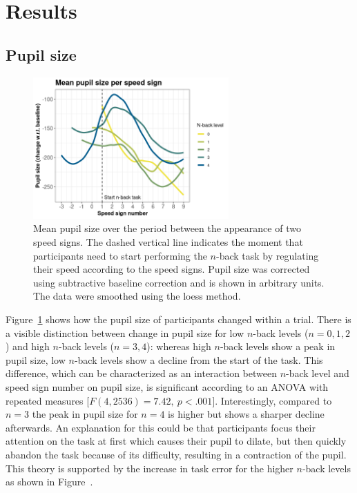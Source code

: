 
\section{Results}\label{sec:results}
\subsection{Pupil size}
\begin{figure}[tp]
  \centering
  \includegraphics[width=7.5cm]{images/speed_sign_nback.png}
  \caption{Mean pupil size over the period between the appearance of two speed signs.
  The dashed vertical line indicates the moment that participants need to start performing the \(n\)-back task by regulating their speed according to the speed signs.
  Pupil size was corrected using subtractive baseline correction and is shown in arbitrary units. 
  The data were smoothed using the loess method.}
  \label{fig:ps-speed-sign}
\end{figure}

Figure~\ref{fig:ps-speed-sign} shows how the pupil size of participants changed within a trial.
There is a visible distinction between change in pupil size for low \(n\)-back levels (\(n = 0,1,2\)) and high \(n\)-back levels (\(n = 3,4\)):
whereas high \(n\)-back levels show a peak in pupil size, low \(n\)-back levels show a decline from the start of the task.
This difference, which can be characterized as an interaction between \(n\)-back level and speed sign number on pupil size, is significant according to an ANOVA with repeated measures [\(F(4,2536)=7.42,\ p < .001\)].
Interestingly, compared to \(n = 3\) the peak in pupil size for \(n = 4\) is higher but shows a sharper decline afterwards.
An explanation for this could be that participants focus their attention on the task at first which causes their pupil to dilate, but then quickly abandon the task because of its difficulty, resulting in a contraction of the pupil.
This theory is supported by the increase in task error for the higher \(n\)-back levels as shown in Figure~.

